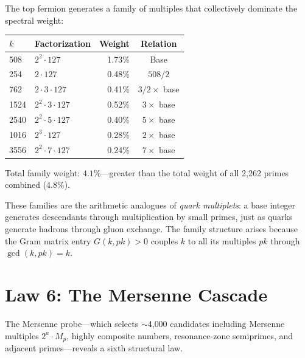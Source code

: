 \documentclass[11pt,a4paper]{article}
\begin{document}
\begin{observation}
The top fermion generates a family of multiples that collectively
dominate the spectral weight:
\begin{center}
\begin{tabular}{@{}llrc@{}}
\toprule
$k$ & Factorization & Weight & Relation \\
\midrule
508  & $2^2 \cdot 127$ & 1.73\% & Base \\
254  & $2 \cdot 127$   & 0.48\% & $508 / 2$ \\
762  & $2 \cdot 3 \cdot 127$ & 0.41\% & $3/2 \times$ base \\
1524 & $2^2 \cdot 3 \cdot 127$ & 0.52\% & $3 \times$ base \\
2540 & $2^2 \cdot 5 \cdot 127$ & 0.40\% & $5 \times$ base \\
1016 & $2^3 \cdot 127$ & 0.28\% & $2 \times$ base \\
3556 & $2^2 \cdot 7 \cdot 127$ & 0.24\% & $7 \times$ base \\
\bottomrule
\end{tabular}
\end{center}
Total family weight: $4.1\%$---greater than the total weight
of all 2{,}262 primes combined ($4.8\%$).
\end{observation}

These families are the arithmetic analogues of \emph{quark multiplets}:
a base integer generates descendants through multiplication by small
primes, just as quarks generate hadrons through gluon exchange. The
family structure arises because the Gram matrix entry $G(k, pk) > 0$
couples $k$ to all its multiples $pk$ through $\gcd(k, pk) = k$.

\section{Law 6: The Mersenne Cascade}
\label{sec:mersenne}

The Mersenne probe---which selects $\sim$4{,}000 candidates including
Mersenne multiples $2^a \cdot M_p$, highly composite numbers, resonance-zone
semiprimes, and adjacent primes---reveals a sixth structural law.
\end{document}

